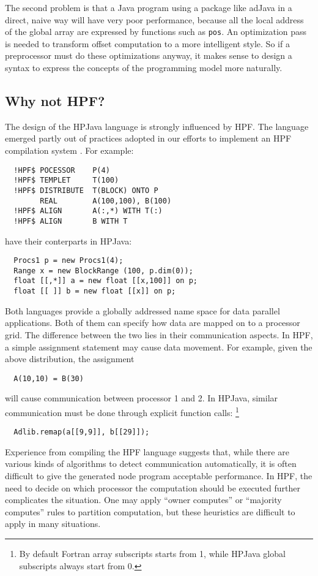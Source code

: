 The second problem is that a Java program using a package like adJava
in a direct, naive way will have very poor performance, because all
the local address of the global array are expressed by functions such
as \texttt{pos}.  An optimization pass is needed to transform offset
computation to a more intelligent style.  So if a preprocessor must do
these optimizations anyway, it makes sense to design a syntax to
express the concepts of the programming model more naturally.

\subsection{Why not HPF?}

The design of the HPJava language is strongly influenced by HPF.
The language emerged partly out of practices adopted in our efforts to
implement an HPF compilation system \cite{Zha97}.  For example:
\begin{small}
\begin{verbatim}
  !HPF$ POCESSOR    P(4)
  !HPF$ TEMPLET     T(100)
  !HPF$ DISTRIBUTE  T(BLOCK) ONTO P
        REAL        A(100,100), B(100)
  !HPF$ ALIGN       A(:,*) WITH T(:)
  !HPF$ ALIGN       B WITH T
\end{verbatim}
\end{small}
have their conterparts in HPJava:
\begin{small}
\begin{verbatim}
  Procs1 p = new Procs1(4);
  Range x = new BlockRange (100, p.dim(0));
  float [[,*]] a = new float [[x,100]] on p;
  float [[ ]] b = new float [[x]] on p;
\end{verbatim}
\end{small}
Both languages provide a globally addressed name space for data parallel
applications.  Both of them can specify how data are mapped on to a
processor grid.  The difference between the two lies in their
communication aspects.  In HPF, a simple assignment statement may cause data
movement.  For example, given the above distribution, the assignment
\begin{small}
\begin{verbatim}
  A(10,10) = B(30)
\end{verbatim}
\end{small}
will cause communication between processor 1 and 2.  In HPJava, similar
communication must be done through explicit function calls: \footnote{By default
Fortran array subscripts starts from 1, while HPJava global subscripts always
start from 0.}
\begin{small}
\begin{verbatim}
  Adlib.remap(a[[9,9]], b[[29]]);
\end{verbatim}
\end{small}
Experience from compiling the HPF language suggests that, while there
are various kinds of algorithms to detect communication automatically,
it is often difficult to give the generated node program acceptable
performance.  In HPF, the need to decide on which processor the
computation should be executed further complicates the situation.  One
may apply ``owner computes'' or ``majority computes'' rules to
partition computation, but these heuristics are difficult to apply in
many situations.

